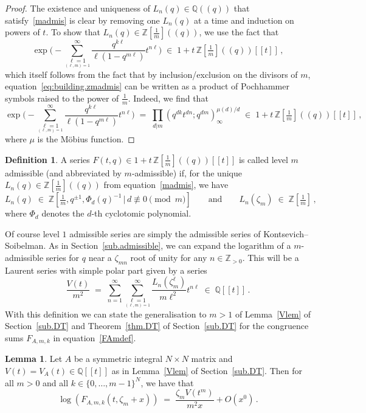 \documentclass[12pt,reqno]{amsart}
\theoremstyle{definition}
\newtheorem{lemma}[proposition]{Lemma}
\newtheorem{definition}[proposition]{Definition}
\def\BZ{\mathbb Z}
\def\BQ{\mathbb Q}
\def\be{\begin{equation}}
\def\ee{\end{equation}}
\def\z{\zeta}
\def\={\;=\;}
\def\inn{\;\in\;}
\begin{document}
\begin{proof}
The existence and uniqueness of $L_{n}(q)\in\BQ(\!(q)\!)$ that
satisfy~\eqref{madmis} is clear by removing one $L_{n}(q)$ at a time and induction
on powers of $t$. To show that $L_{n}(q)\in\BZ[\tfrac{1}{m}](\!(q)\!)$, we use
the fact that
\be
\label{eq:building.zmadmis}
\exp\bigg(\!-\sum_{\underset{(\ell,m)=1}{\ell=1}}^{\infty}
\frac{q^{k\ell}}{\ell(1-q^{m\ell})} t^{n\ell}\bigg)
\inn 1+t\,\BZ[\tfrac{1}{m}](\!(q)\!)[\![t]\!]\,,
\ee
which itself follows from the fact that by inclusion/exclusion on the divisors of $m$,
equation~\eqref{eq:building.zmadmis} can be written as a product of Pochhammer
symbols raised to the power of $\tfrac{1}{m}$. Indeed, we find that
\be
\exp\bigg(\!-
\sum_{\underset{(\ell,m)=1}{\ell=1}}^{\infty}
\frac{q^{k\ell}}{\ell(1-q^{m\ell})}
t^{n\ell}\bigg)
\=
\prod_{d|m}(q^{dk}t^{dn};q^{dm})_{\infty}^{\mu(d)/d}
\inn
1+t\,\BZ[\tfrac{1}{m}](\!(q)\!)[\![t]\!]\,,
\ee
where $\mu$ is the Möbius function.
\end{proof}

\begin{definition}
\label{def.zmadmis}
A series $F(t,q)\in1+t\,\BZ[\tfrac{1}{m}](\!(q)\!)[\![t]\!]$ is called level
$m$ admissible (and abbreviated by $m$-admissible) if, for the unique
$L_{n}(q)\in\BZ[\tfrac{1}{m}](\!(q)\!)$ from equation~\eqref{madmis}, we have
\be
L_{n}(q)
\inn\BZ[\tfrac{1}{m},q^{\pm1},\Phi_{d}(q)^{-1}
\,|\,d\not\equiv0\pmod{m}]
\qquad\text{and}\qquad
L_n(\z_m)\inn\BZ[\tfrac{1}{m}]\,,
\ee
where $\Phi_{d}$ denotes the $d$-th cyclotomic polynomial.
\end{definition}

Of course level $1$ admissible series are simply the admissible series of
Kontsevich--Soibelman. As in Section~\ref{sub.admissible}, we can expand the
logarithm of a $m$-admissible series for $q$ near a $\z_{mn}$ root of unity for any
$n\in\BZ_{>0}$. This will be a Laurent series with simple polar part given by a
series
\be
\label{eq:Vt.m}
\frac{V(t)}{m^2} \= \sum_{n=1}^{\infty} \sum_{\underset{(\ell,m)=1}{\ell=1}}^{\infty}
\frac{L_{n}(\z_m^{\ell})}{m\ell^2} t^{n\ell} \inn\BQ[\![t]\!]\,.
\ee
With this definition we can state the generalisation to $m>1$ of Lemma~\ref{Vlem}
of Section~\ref{sub.DT} and Theorem~\ref{thm.DT} of Section~\ref{sub.DT} for the
congruence sums $F_{A,m,k}$ in equation~\eqref{FAmdef}. 

\begin{lemma}
\label{Vlem.m}
Let $A$ be a symmetric integral $N \times N$ matrix and $V(t)=V_A(t)\in\BQ[\![t]\!]$
as in Lemma~\ref{Vlem} of Section~\ref{sub.DT}. Then for all $m>0$
and all $k\in\{0,\dots,m-1\}^N$, we have that
\be
\log(F_{A,m,k}(t,\z_m+x)) \= \frac{\z_mV(t^m)}{m^2x}+O(x^0)\,.
\ee
\end{lemma}
\end{document}
